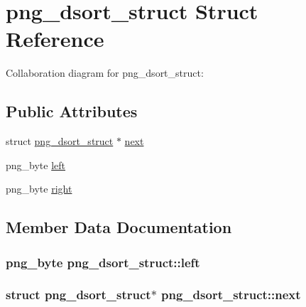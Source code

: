 \hypertarget{structpng__dsort__struct}{}\section{png\+\_\+dsort\+\_\+struct Struct Reference}
\label{structpng__dsort__struct}


Collaboration diagram for png\+\_\+dsort\+\_\+struct\+:
\subsection*{Public Attributes}
\begin{DoxyCompactItemize}
\item 
struct \hyperlink{structpng__dsort__struct}{png\+\_\+dsort\+\_\+struct} $\ast$ \hyperlink{structpng__dsort__struct_a015adbadb5473fcf79d966c08229c900}{next}
\item 
png\+\_\+byte \hyperlink{structpng__dsort__struct_a09ba275bb5489f22e906be30b63f5452}{left}
\item 
png\+\_\+byte \hyperlink{structpng__dsort__struct_a9cfe3ab6de9319c0d18dd16075c21fa2}{right}
\end{DoxyCompactItemize}


\subsection{Member Data Documentation}
\hypertarget{structpng__dsort__struct_a09ba275bb5489f22e906be30b63f5452}{}
\subsubsection[{left}]{\setlength{\rightskip}{0pt plus 5cm}png\+\_\+byte png\+\_\+dsort\+\_\+struct\+::left}\label{structpng__dsort__struct_a09ba275bb5489f22e906be30b63f5452}
\hypertarget{structpng__dsort__struct_a015adbadb5473fcf79d966c08229c900}{}
\subsubsection[{next}]{\setlength{\rightskip}{0pt plus 5cm}struct {\bf png\+\_\+dsort\+\_\+struct}$\ast$ png\+\_\+dsort\+\_\+struct\+::next}\label{structpng__dsort__struct_a015adbadb5473fcf79d966c08229c900}
\hypertarget{structpng__dsort__struct_a9cfe3ab6de9319c0d18dd16075c21fa2}{}

